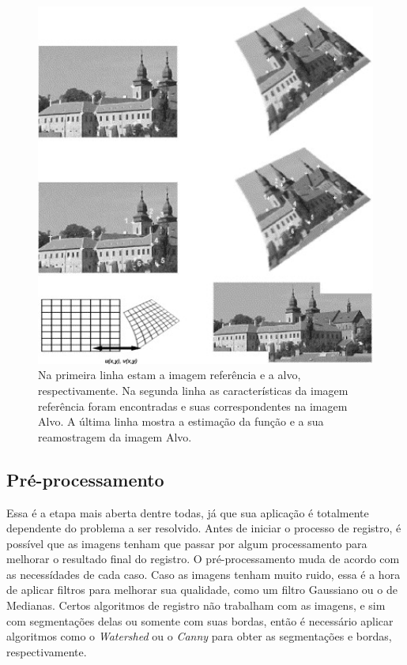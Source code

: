 \begin{figure}[H]
    \centering
    \includegraphics[width=1\textwidth]{figuras/regSteps.jpg}
    \caption{Na primeira linha estam a imagem referência e a alvo, respectivamente. Na segunda linha as características
da imagem referência foram encontradas e suas correspondentes na imagem Alvo. A última linha mostra a estimação da 
função e a sua reamostragem da imagem Alvo. \citep{zitova2003image}}
    \label{fig:regExplicacao}
\end{figure}

\subsection{Pré-processamento}
    Essa é a etapa mais aberta dentre todas, já que sua aplicação é totalmente dependente do problema a ser resolvido. 
Antes de iniciar o processo de registro, é possível que as imagens tenham que passar por algum processamento para 
melhorar o resultado final do registro. O pré-processamento muda de acordo com as necessídades de cada caso. Caso as
imagens tenham muito ruido, essa é a hora de aplicar filtros para melhorar sua qualidade, como um filtro Gaussiano ou 
o de Medianas. Certos algoritmos de registro não trabalham com as imagens, e sim com segmentações delas ou somente com 
suas bordas, então é necessário aplicar algoritmos como o \textit{Watershed} ou o \textit{Canny} para obter as 
segmentações e bordas, respectivamente.

